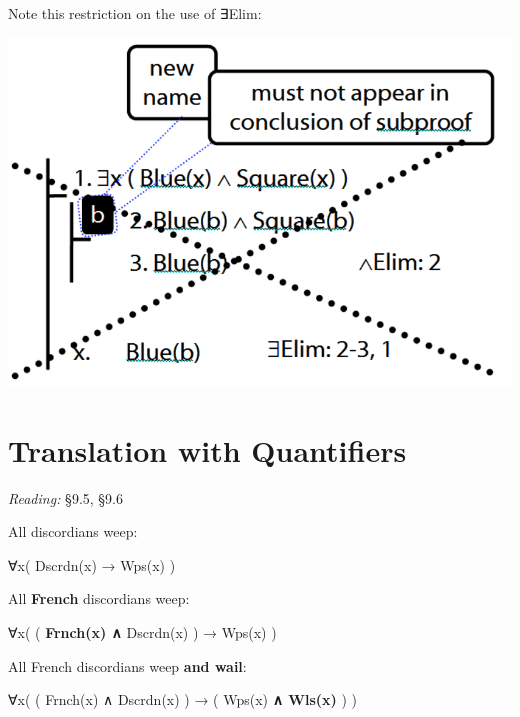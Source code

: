 \documentclass[12pt]{extarticle}
\begin{document}
\begin{multicols*}{3}
\begin{minipage}{\columnwidth}
Note this restriction on the use of ∃Elim:
 
\begin{center}
\includegraphics[scale=0.3]{img/proof_existential_elim_incorrect.png}
\end{center}
\end{minipage}
 
 
 
\section{Translation with Quantifiers}
 
\emph{Reading:} §9.5, §9.6
 
\begin{minipage}{\columnwidth}
 
All discordians weep:
 
∀x( Dscrdn(x) → Wps(x) )
 
\end{minipage}
 
\begin{minipage}{\columnwidth}
 
All \textbf{French} discordians weep:
 
∀x( ( \textbf{Frnch(x) ∧} Dscrdn(x) ) → Wps(x) )
 
\end{minipage}
 
\begin{minipage}{\columnwidth}
 
All French discordians weep \textbf{and wail}:
 
∀x( ( Frnch(x) ∧ Dscrdn(x) ) → ( Wps(x) \textbf{ ∧ Wls(x)} ) )
 

\end{minipage}
\end{multicols*}
\end{document}
